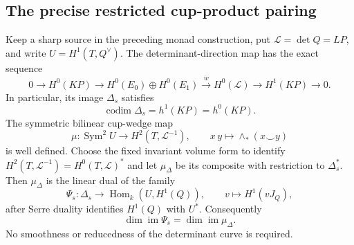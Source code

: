 \subsection{The precise restricted cup-product pairing}

\begin{lemma}
\label{lem:DE-A3-positive-restricted-Petri-note}
Keep a sharp source in the preceding monad construction, put
$\mathcal L=\det Q=LP$, and write $U=H^1(T,Q^\vee)$.
The determinant-direction map has the exact sequence
\[
0\longrightarrow H^0(KP)\longrightarrow
H^0(E_0)\oplus H^0(E_1)\xrightarrow{\dot w}
H^0(\mathcal L)\longrightarrow H^1(KP)\longrightarrow0.
\tag{DE-PT1}
\]
In particular, its image $\Delta_s$ satisfies
\[
\operatorname{codim}\Delta_s=h^1(KP)=h^0(KP).
\tag{DE-PT2}
\]
The symmetric bilinear cup-wedge map
\[
\mu:\operatorname{Sym}^2 U\longrightarrow
H^2(T,\mathcal L^{-1}),\qquad
x\,y\longmapsto \wedge_*(x\mathbin{\smile}y)
\tag{DE-PT3}
\]
is well defined. Choose the fixed invariant volume form to identify
$H^2(T,\mathcal L^{-1})=H^0(T,\mathcal L)^*$ and let
$\mu_{\Delta}$ be its composite with restriction to $\Delta_s^*$.
Then $\mu_{\Delta}$ is the linear dual of the family
\[
\Psi_s:\Delta_s\longrightarrow
\operatorname{Hom}_k(U,H^1(Q)),\qquad
v\longmapsto H^1(vJ_Q),
\]
after Serre duality identifies $H^1(Q)$ with $U^*$.
Consequently
\[
\dim\operatorname{im}\Psi_s=\dim\operatorname{im}\mu_{\Delta}.
\tag{DE-PT4}
\]
No smoothness or reducedness of the determinant curve is required.
\end{lemma}
